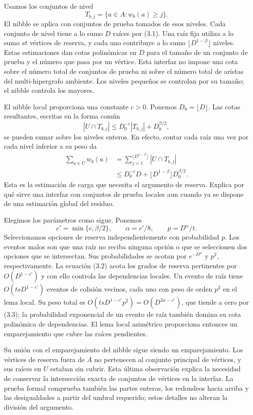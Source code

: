 \documentclass[spanish,11pt,a4paper]{article}
\begin{document}
Usamos los conjuntos de nivel \[T_{b,j}=\{a\in A:w_b(a)\ge j\}.\] El nibble se aplica con conjuntos de prueba tomados de esos niveles. Cada conjunto de nivel tiene a lo sumo \(D\) raíces por (3.1). Una raíz fija utiliza a lo sumo \(s t\) vértices de reserva, y cada uno contribuye a lo sumo \(\lfloor D^{1-\beta}\rfloor\) niveles. Estas estimaciones dan cotas polinómicas en \(D\) para el tamaño de un conjunto de prueba y el número que pasa por un vértice. Esta interfaz no impone una cota sobre el número total de conjuntos de prueba ni sobre el número total de aristas del multi-hipergrafo ambiente. Los niveles pequeños se controlan por su tamaño; el nibble controla los mayores.

El nibble local proporciona una constante \(c>0\). Ponemos \(D_0=\lfloor D\rfloor\). Las cotas resultantes, escritas en la forma común \[|U\cap T_{b,j}|
\le D_0^{-c}|T_{b,j}|+D_0^{\beta/2},\] se pueden sumar sobre los niveles enteros. En efecto, contar cada raíz una vez por cada nivel inferior a su peso da \[\begin{aligned}
\sum_{a\in U}w_b(a)
&=\sum_{j=1}^{\lfloor D^{1-\beta}\rfloor}|U\cap T_{b,j}|\\
&\le D_0^{-c}D+
 \lfloor D^{1-\beta}\rfloor D_0^{\beta/2}.
\end{aligned}
\tag{3.2}\] Esta es la estimación de carga que necesita el argumento de reserva. Explica por qué sirve una interfaz con conjuntos de prueba locales aun cuando ya se dispone de una estimación global del residuo.

Elegimos los parámetros como sigue. Ponemos \[c'=\min\{c,\beta/2\},\qquad
\alpha=c'/8,\qquad p=D^\alpha/t.
\tag{3.3}\] Seleccionamos opciones de reserva independientemente con probabilidad \(p\). Los eventos malos son que una raíz no reciba ninguna opción o que se seleccionen dos opciones que se intersectan. Sus probabilidades se acotan por \(e^{-D^\alpha}\) y \(p^2\), respectivamente. La ecuación (3.2) acota los grados de reserva pertinentes por \(O(D^{1-c'})\) y con ello controla las dependencias locales. Un evento de raíz tiene \(O(t s D^{1-c'})\) eventos de colisión vecinos, cada uno con peso de orden \(p^2\) en el lema local. Su peso total es \(O(t s D^{1-c'}p^2)=O(D^{3\alpha-c'})\), que tiende a cero por (3.3); la probabilidad exponencial de un evento de raíz también domina su cota polinómica de dependencias. El lema local asimétrico proporciona entonces un emparejamiento que cubre las raíces pendientes.

Su unión con el emparejamiento del nibble sigue siendo un emparejamiento. Los vértices de reserva fuera de \(A\) no pertenecen al conjunto principal de vértices, y sus raíces en \(U\) estaban sin cubrir. Esta última observación explica la necesidad de conservar la intersección exacta de conjuntos de vértices en la interfaz. La prueba formal comprueba también las partes enteras, los redondeos hacia arriba y las desigualdades a partir del umbral requerido; estos detalles no alteran la división del argumento.
\end{document}

